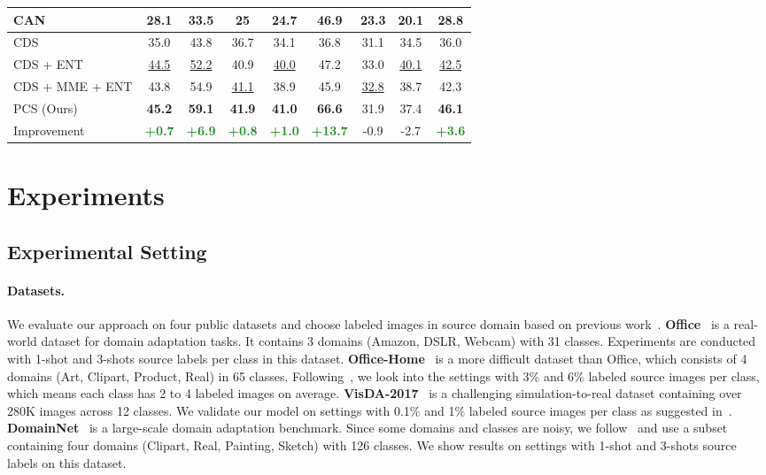 \documentclass[final]{cvpr}
\newcommand{\FG}[1]{\textcolor{ForestGreen}{\textbf{#1}}}
\begin{document}
\begin{table}[]
{\begin{tabular}{l|cccccccc}
CAN~\cite{kang2019contrastive} & 28.1 & 33.5 & 25 & 24.7 & 46.9 & 23.3 & 20.1 & 28.8 \\ \midrule
CDS~\cite{kim2020cross} & 35.0 & 43.8 & 36.7 & 34.1 & 36.8 & 31.1 & 34.5 & 36.0 \\
CDS + ENT & \underline{44.5} & \underline{52.2} & 40.9 & \underline{40.0} & 47.2 & 33.0 & \underline{40.1} & \underline{42.5} \\
CDS + MME + ENT & 43.8 & 54.9 & \underline{41.1} & 38.9 & 45.9 & \underline{32.8} & 38.7 & 42.3 \\ \midrule
PCS (Ours) & \textbf{45.2} & \textbf{59.1} & \textbf{41.9} & \textbf{41.0} & \textbf{66.6} & 31.9 & 37.4 & \textbf{46.1} \\
Improvement & \FG{+0.7} & \FG{+6.9} & \FG{+0.8} & \FG{+1.0} & \FG{+13.7} & -0.9 & -2.7 & \FG{+3.6} \\
\bottomrule
\end{tabular}}
\label{tab:domainnet}
\vspace{-4mm}
\end{table}

\vspace{-4mm}
\section{Experiments}

\subsection{Experimental Setting}
\paragraph{Datasets.}
We evaluate our approach on four public datasets and choose labeled images in source domain based on previous work~\cite{kim2020cross}. \textbf{Office}~\cite{saenko2010adapting} is a real-world dataset for domain adaptation tasks. It contains 3 domains (Amazon, DSLR, Webcam) with 31 classes.
Experiments are conducted with 1-shot and 3-shots source labels per class in this dataset. 
\textbf{Office-Home}~\cite{venkateswara2017deep} is a more difficult dataset than Office, which consists of 4 domains (Art, Clipart, Product, Real) in 65 classes. 
Following~\cite{kim2020cross}, we look into the settings with 3\% and 6\% labeled source images per class, which means each class has 2 to 4 labeled images on average.
\textbf{VisDA-2017}~\cite{peng2017visda} is a challenging simulation-to-real dataset containing over 280K images across 12 classes. 
We validate our model on settings with 0.1\% and 1\% labeled source images per class as suggested in~\cite{kim2020cross}. 
\textbf{DomainNet}~\cite{peng2019moment} is a large-scale domain adaptation benchmark. Since some domains and classes are noisy, we follow~\cite{saito2019semi} and use a subset containing four domains (Clipart, Real, Painting, Sketch) with 126 classes.
We show results on settings with 1-shot and 3-shots source labels on this dataset.
\end{document}
